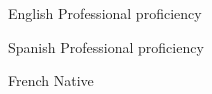 
\begin{cvskills}

  \cvskill
    {English} %
    {Professional proficiency} %

  \cvskill
    {Spanish} %
    {Professional proficiency} %

  \cvskill
    {French} %
    {Native} %

\end{cvskills}
